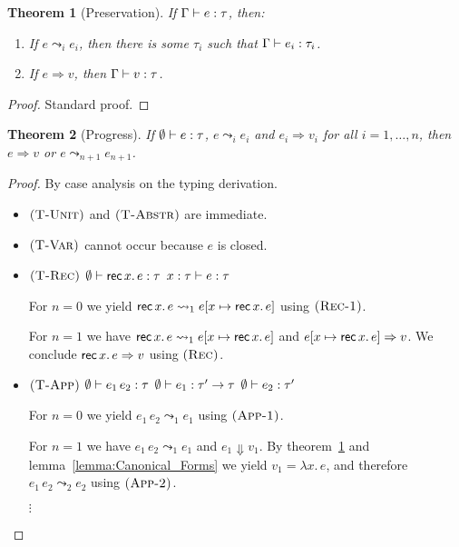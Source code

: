 \documentclass[12pt,a2paper,draft]{article}
\newcommand{\abstr}[2]{\ensuremath{\lambda{#1}.\,{#2}}}
\newcommand{\app}[2]{\ensuremath{{#1}\,{#2}}}
\newcommand{\rec}[2]{\ensuremath{{\normalfont\textsf{rec}}\,{#1}.\,{#2}}}
\newcommand{\Tj}[3]{\mbox{\ensuremath{{#1}\vdash{#2}:{#3}}}}
\newcommand{\tj}[2]{\Tj{\emptyset}{#1}{#2}}
\newcommand{\rn}[1]{\mbox{\ensuremath{\textsc{(#1)}}}}
\newtheorem{theorem}{Theorem}
\begin{document}
\begin{theorem}[Preservation] \label{theorem:Preservation}
  If $\Tj{\Gamma}{e}{\tau}$, then:
  \begin{enumerate}
  \item If $e \leadsto_i e_i$, then there is some $\tau_i$ such that $\Tj{\Gamma}{e_i}{\tau_i}$.
  \item If $e \Rightarrow v$, then $\Tj{\Gamma}{v}{\tau}$.
  \end{enumerate}
\end{theorem}

\begin{proof}
  Standard proof.
\end{proof}

\begin{theorem}[Progress] \label{theorem:Progress}
  If $\tj{e}{\tau}$, $e \leadsto_i e_i$ and $e_i \Rightarrow v_i$ for all $i=1,\ldots,n$, then
  $e \Rightarrow v$ or $e \leadsto_{n+1} e_{n+1}$.
\end{theorem}

\begin{proof}
  By case analysis on the typing derivation.
  \begin{itemize}
  \item \rn{T-Unit} and \rn{T-Abstr} are immediate.
  \item \rn{T-Var} cannot occur because $e$ is closed.
  \item \rn{T-Rec} \quad $\tj{\rec{x}{e}}{\tau}$ \quad $\Tj{x:\tau}{e}{\tau}$

    For $n = 0$ we yield $\rec{x}{e} \leadsto_1 e[x \mapsto \rec{x}{e}]$ using \rn{Rec-1}.

    For $n = 1$ we have $\rec{x}{e} \leadsto_1 e[x \mapsto \rec{x}{e}]$ and
    $e[x \mapsto \rec{x}{e}] \Rightarrow v$. We conclude $\rec{x}{e} \Rightarrow v$
    using \rn{Rec}.

  \item \rn{T-App} \quad $\tj{\app{e_1}{e_2}}{\tau}$ \quad $\tj{e_1}{\tau' \to \tau}$ \quad $\tj{e_2}{\tau'}$

    For $n = 0$ we yield $\app{e_1}{e_2} \leadsto_1 e_1$ using \rn{App-1}.

    For $n = 1$ we have $\app{e_1}{e_2} \leadsto_1 e_1$ and $e_1 \Downarrow v_1$.
    By theorem~\ref{theorem:Preservation} and lemma~\ref{lemma:Canonical_Forms} we
    yield $v_1 = \abstr{x}{e}$, and therefore $\app{e_1}{e_2} \leadsto_2 e_2$ using
    \rn{App-2}.

    $\vdots$
  \end{itemize}
\end{proof}
\end{document}
